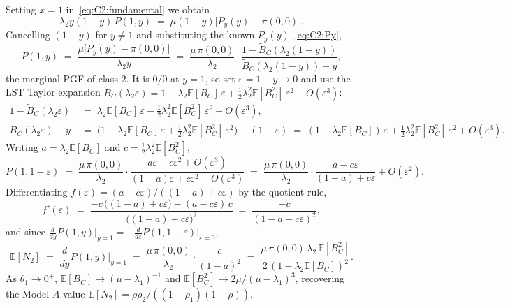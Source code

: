 \documentclass{article}
\numberwithin{equation}{section}
\begin{document}
Setting $x=1$ in~\eqref{eq:C2:fundamental} we obtain
\begin{equation*}
    \lambda_2 y(1-y)\,P(1,y) \;=\; \mu(1-y)\bigl[P_y(y)-\pi(0,0)\bigr].
\end{equation*}
Cancelling $(1-y)$ for $y\neq1$ and substituting the known $P_y(y)$~\eqref{eq:C2:Py},
\begin{equation*}
    P(1,y)
    \;=\; \frac{\mu\bigl[P_y(y)-\pi(0,0)\bigr]}{\lambda_2 y}
    \;=\; \frac{\mu\,\pi(0,0)}{\lambda_2}\cdot\frac{1-\widetilde{B}_C(\lambda_2(1-y))}{\widetilde{B}_C(\lambda_2(1-y))-y},
\end{equation*}
the marginal PGF of class-$2$. It is $0/0$ at $y=1$, so set $\varepsilon=1-y\to0$ and use the LST Taylor expansion $\widetilde{B}_C(\lambda_2\varepsilon)=1-\lambda_2\mathbb{E}[B_C]\,\varepsilon+\tfrac{1}{2}\lambda_2^2\mathbb{E}[B_C^2]\,\varepsilon^2+O(\varepsilon^3)$:
\begin{align*}
    1-\widetilde{B}_C(\lambda_2\varepsilon)
    &\;=\; \lambda_2\mathbb{E}[B_C]\,\varepsilon
           -\tfrac{1}{2}\lambda_2^2\mathbb{E}[B_C^2]\,\varepsilon^2+O(\varepsilon^3), \\
    \widetilde{B}_C(\lambda_2\varepsilon)-y
    &\;=\; \bigl(1-\lambda_2\mathbb{E}[B_C]\,\varepsilon+\tfrac{1}{2}\lambda_2^2\mathbb{E}[B_C^2]\,\varepsilon^2\bigr)-(1-\varepsilon)
    \;=\; (1-\lambda_2\mathbb{E}[B_C])\,\varepsilon
           +\tfrac{1}{2}\lambda_2^2\mathbb{E}[B_C^2]\,\varepsilon^2+O(\varepsilon^3).
\end{align*}
Writing $a=\lambda_2\mathbb{E}[B_C]$ and $c=\tfrac{1}{2}\lambda_2^2\mathbb{E}[B_C^2]$,
\begin{equation*}
    P(1,1-\varepsilon)
    \;=\; \frac{\mu\,\pi(0,0)}{\lambda_2}\cdot\frac{a\varepsilon - c\varepsilon^2+O(\varepsilon^3)}{(1-a)\varepsilon+c\varepsilon^2+O(\varepsilon^3)}
    \;=\; \frac{\mu\,\pi(0,0)}{\lambda_2}\cdot\frac{a-c\varepsilon}{(1-a)+c\varepsilon}+O(\varepsilon^2).
\end{equation*}
Differentiating $f(\varepsilon)=(a-c\varepsilon)/((1-a)+c\varepsilon)$ by the quotient rule,
\begin{equation*}
    f'(\varepsilon)
    \;=\; \frac{-c\,\bigl((1-a)+c\varepsilon\bigr)-(a-c\varepsilon)\,c}{\bigl((1-a)+c\varepsilon\bigr)^2}
    \;=\; \frac{-c}{(1-a+c\varepsilon)^2},
\end{equation*}
and since $\tfrac{d}{dy}P(1,y)\big|_{y=1}=-\tfrac{d}{d\varepsilon}P(1,1-\varepsilon)\big|_{\varepsilon=0}$,
\begin{equation}
    \mathbb{E}[N_2]
    \;=\; \frac{d}{dy}P(1,y)\bigg|_{y=1}
    \;=\; \frac{\mu\,\pi(0,0)}{\lambda_2}\cdot\frac{c}{(1-a)^2}
    \;=\; \frac{\mu\,\pi(0,0)\,\lambda_2\,\mathbb{E}[B_C^2]}{2\,(1-\lambda_2\mathbb{E}[B_C])^2}.
    \label{eq:C2:EN2}
\end{equation}
As $\theta_1\to0^+$, $\mathbb{E}[B_C]\to(\mu-\lambda_1)^{-1}$ and $\mathbb{E}[B_C^2]\to2\mu/(\mu-\lambda_1)^3$, recovering the Model-$A$ value $\mathbb{E}[N_2]=\rho\rho_2/((1-\rho_1)(1-\rho))$.
\end{document}
